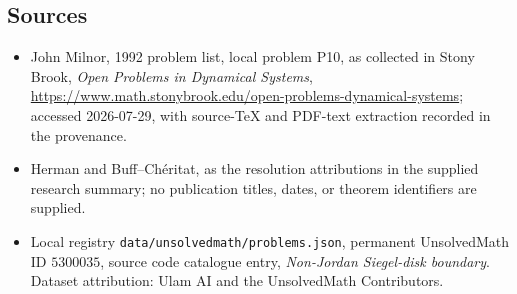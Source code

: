 \documentclass[11pt]{article}
\begin{document}
\subsection{Sources}
\begin{itemize}
\item John Milnor, 1992 problem list, local problem P10, as collected in Stony Brook, \emph{Open Problems in Dynamical Systems}, \url{https://www.math.stonybrook.edu/open-problems-dynamical-systems}; accessed 2026-07-29, with source-TeX and PDF-text extraction recorded in the provenance.
\item Herman and Buff--Ch\'eritat, as the resolution attributions in the supplied research summary; no publication titles, dates, or theorem identifiers are supplied.
\item Local registry \texttt{data/unsolvedmath/problems.json}, permanent UnsolvedMath ID $5300035$, source code catalogue entry, \emph{Non-Jordan Siegel-disk boundary}. Dataset attribution: Ulam AI and the UnsolvedMath Contributors.
\end{itemize}
\end{document}
